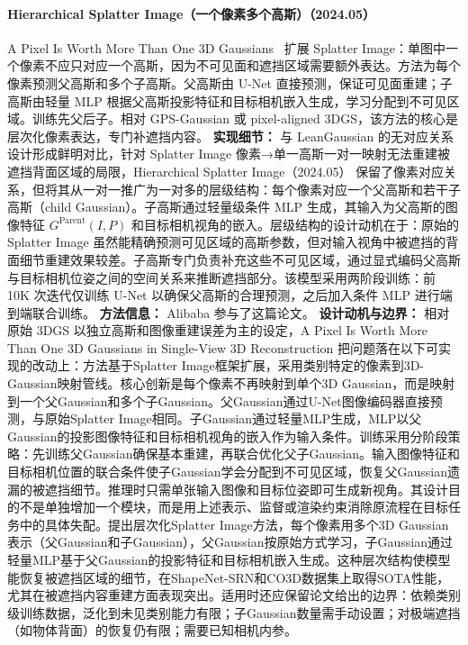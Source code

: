 \paragraph{Hierarchical Splatter Image（一个像素多个高斯）（2024.05）}
A Pixel Is Worth More Than One 3D Gaussians~\cite{2405_20310} 扩展 Splatter Image：单图中一个像素不应只对应一个高斯，因为不可见面和遮挡区域需要额外表达。方法为每个像素预测父高斯和多个子高斯。父高斯由 U-Net 直接预测，保证可见面重建；子高斯由轻量 MLP 根据父高斯投影特征和目标相机嵌入生成，学习分配到不可见区域。训练先父后子。相对 GPS-Gaussian 或 pixel-aligned 3DGS，该方法的核心是层次化像素表达，专门补遮挡内容。
\textbf{实现细节：} 与 LeanGaussian 的无对应关系设计形成鲜明对比，针对 Splatter Image 像素→单一高斯一对一映射无法重建被遮挡背面区域的局限，Hierarchical Splatter Image（2024.05） 保留了像素对应关系，但将其从一对一推广为一对多的层级结构：每个像素对应一个父高斯和若干子高斯（child Gaussian）。子高斯通过轻量级条件 MLP 生成，其输入为父高斯的图像特征 $G^{\mathrm{Parent}}(I, P)$ 和目标相机视角的嵌入。层级结构的设计动机在于：原始的 Splatter Image 虽然能精确预测可见区域的高斯参数，但对输入视角中被遮挡的背面细节重建效果较差。子高斯专门负责补充这些不可见区域，通过显式编码父高斯与目标相机位姿之间的空间关系来推断遮挡部分。该模型采用两阶段训练：前 10K 次迭代仅训练 U-Net 以确保父高斯的合理预测，之后加入条件 MLP 进行端到端联合训练。
\textbf{方法信息：} Alibaba 参与了这篇论文。
\textbf{设计动机与边界：} 相对原始 3DGS 以独立高斯和图像重建误差为主的设定，A Pixel Is Worth More Than One 3D Gaussians in Single-View 3D Reconstruction 把问题落在以下可实现的改动上：方法基于Splatter Image框架扩展，采用类别特定的像素到3D-Gaussian映射管线。核心创新是每个像素不再映射到单个3D Gaussian，而是映射到一个父Gaussian和多个子Gaussian。父Gaussian通过U-Net图像编码器直接预测，与原始Splatter Image相同。子Gaussian通过轻量MLP生成，MLP以父Gaussian的投影图像特征和目标相机视角的嵌入作为输入条件。训练采用分阶段策略：先训练父Gaussian确保基本重建，再联合优化父子Gaussian。输入图像特征和目标相机位置的联合条件使子Gaussian学会分配到不可见区域，恢复父Gaussian遗漏的被遮挡细节。推理时只需单张输入图像和目标位姿即可生成新视角。其设计目的不是单独增加一个模块，而是用上述表示、监督或渲染约束消除原流程在目标任务中的具体失配。提出层次化Splatter Image方法，每个像素用多个3D Gaussian表示（父Gaussian和子Gaussian），父Gaussian按原始方式学习，子Gaussian通过轻量MLP基于父Gaussian的投影特征和目标相机嵌入生成。这种层次结构使模型能恢复被遮挡区域的细节，在ShapeNet-SRN和CO3D数据集上取得SOTA性能，尤其在被遮挡内容重建方面表现突出。适用时还应保留论文给出的边界：依赖类别级训练数据，泛化到未见类别能力有限；子Gaussian数量需手动设置；对极端遮挡（如物体背面）的恢复仍有限；需要已知相机内参。
